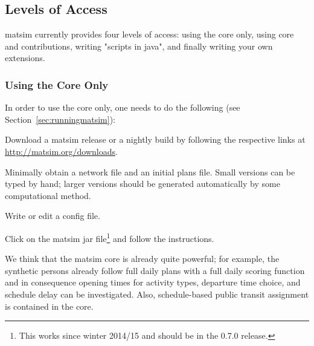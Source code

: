 \subsection{Levels of Access}
\label{sec:levels-of-access}
\gls{matsim} currently provides four levels of access: using the core only, using core and \glspl{contribution}, writing "scripts in \gls{java}", and finally writing your own \glspl{extension}.

\subsubsection{Using the Core Only}
\label{sec:using-core-only}


In order to use the core only, one needs to do the following (see Section~\ref{sec:runningmatsim}):
\begin{compactitem}
\item Download a \gls{matsim} release or a nightly build by following the respective links at %
\url{http://matsim.org/downloads}.
\item Minimally obtain a network file and an initial plans file.  Small versions can be typed by hand; larger versions should be generated automatically by some computational method.
\item Write or edit a config file.
\item Click on the \gls{matsim} jar file\footnote{This works since winter 2014/15 and should be in the 0.7.0 release.} and follow the instructions. 
\end{compactitem}
We think that the \gls{matsim} core is already quite powerful; for example, the synthetic persons already follow full daily plans with a full daily scoring function and in consequence opening times for activity types, departure time choice, and schedule delay can be investigated. Also, schedule-based public transit assignment is contained in the core.

